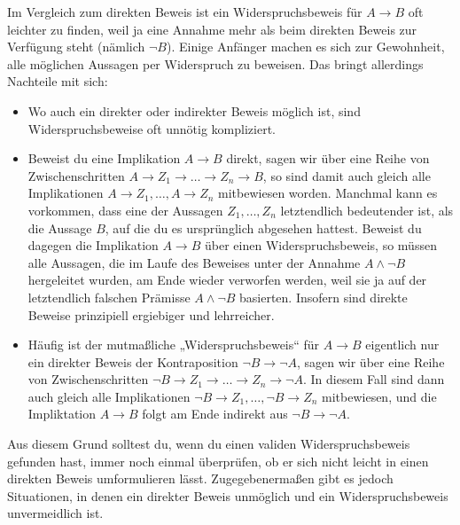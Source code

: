  
\begin{bem}
    Im Vergleich zum direkten Beweis ist ein Widerspruchsbeweis für $A\to B$ oft leichter zu finden, weil ja eine Annahme mehr als beim direkten Beweis zur Verfügung steht (nämlich $\neg B$). Einige Anfänger machen es sich zur Gewohnheit, alle möglichen Aussagen per Widerspruch zu beweisen. Das bringt allerdings Nachteile mit sich:
    \begin{itemize}
        \item Wo auch ein direkter oder indirekter Beweis möglich ist, sind Widerspruchsbeweise oft unnötig kompliziert.
        \item Beweist du eine Implikation $A\to B$ direkt, sagen wir über eine Reihe von Zwischenschritten $A\to Z_1\to\ldots\to Z_n\to B$, so sind damit auch gleich alle Implikationen $A\to Z_1,\dots , A\to Z_n$ mitbewiesen worden. Manchmal kann es vorkommen, dass eine der Aussagen $Z_1,\dots , Z_n$ letztendlich bedeutender ist, als die Aussage $B$, auf die du es ursprünglich abgesehen hattest. Beweist du dagegen die Implikation $A\to B$ über einen Widerspruchsbeweis, so müssen alle Aussagen, die im Laufe des Beweises unter der Annahme $A\land \neg B$ hergeleitet wurden, am Ende wieder verworfen werden, weil sie ja auf der letztendlich falschen Prämisse $A\land \neg B$ basierten. Insofern sind direkte Beweise prinzipiell ergiebiger und lehrreicher.
        \item Häufig ist der mutmaßliche „Widerspruchsbeweis“ für $A\to B$ eigentlich nur ein direkter Beweis der Kontraposition $\neg B\to \neg A$, sagen wir über eine Reihe von Zwischenschritten $\neg B \to Z_1\to\ldots\to Z_n\to \neg A$. In diesem Fall sind dann auch gleich alle Implikationen $\neg B\to Z_1,\dots , \neg B\to Z_n$ mitbewiesen, und die Impliktation $A\to B$ folgt am Ende indirekt aus $\neg B\to \neg A$.
    \end{itemize}
    Aus diesem Grund solltest du, wenn du einen validen Widerspruchsbeweis gefunden hast, immer noch einmal überprüfen, ob er sich nicht leicht in einen direkten Beweis umformulieren lässt. Zugegebenermaßen gibt es jedoch Situationen, in denen ein direkter Beweis unmöglich und ein Widerspruchsbeweis unvermeidlich ist.
\end{bem}


